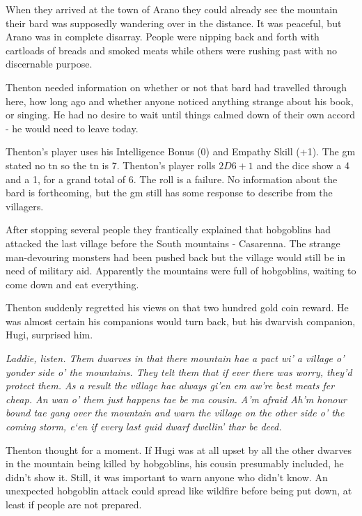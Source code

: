 \begin{multicols}{2}
\begin{exampletext}

When they arrived at the town of Arano they could already see the mountain their bard was supposedly wandering over in the distance. It was peaceful, but Arano was in complete disarray. People were nipping back and forth with cartloads of breads and smoked meats while others were rushing past with no discernable purpose.

Thenton needed information on whether or not that bard had travelled through here, how long ago and whether anyone noticed anything strange about his book, or singing. He had no desire to wait until things calmed down of their own accord - he would need to leave today.

Thenton's player uses his Intelligence Bonus (0) and Empathy Skill (+1).
The \gls{gm} stated no \gls{tn} so the \gls{tn} is 7.
Thenton's player rolls $2D6+1$ and the dice show a 4 and a 1, for a grand total of 6.
The roll is a failure.
No information about the bard is forthcoming, but the \gls{gm} still has some response to describe from the villagers.

After stopping several people they frantically explained that hobgoblins had attacked the last village before the South mountains - Casarenna.
The strange man-devouring monsters had been pushed back but the village would still be in need of military aid.
Apparently the mountains were full of hobgoblins, waiting to come down and eat everything.

Thenton suddenly regretted his views on that two hundred gold coin reward. He was almost certain his companions would turn back, but his dwarvish companion, Hugi, surprised him.

	\emph{Laddie, listen. Them dwarves in that there mountain hae a pact wi' a village o' yonder side o' the mountains. They telt them that if ever there was worry, they'd protect them. As a result the village hae always gi'en em aw're best meats fer cheap. An wan o' them just happens tae be ma cousin. A'm afraid Ah'm honour bound tae gang over the mountain and warn the village on the other side o' the coming storm, e`en if every last guid dwarf dwellin' thar be deed.}

Thenton thought for a moment. If Hugi was at all upset by all the other dwarves in the mountain being killed by hobgoblins, his cousin presumably included, he didn't show it.
Still, it was important to warn anyone who didn't know.
An unexpected hobgoblin attack could spread like wildfire before being put down, at least if people are not prepared.


\end{exampletext}
\end{multicols}
